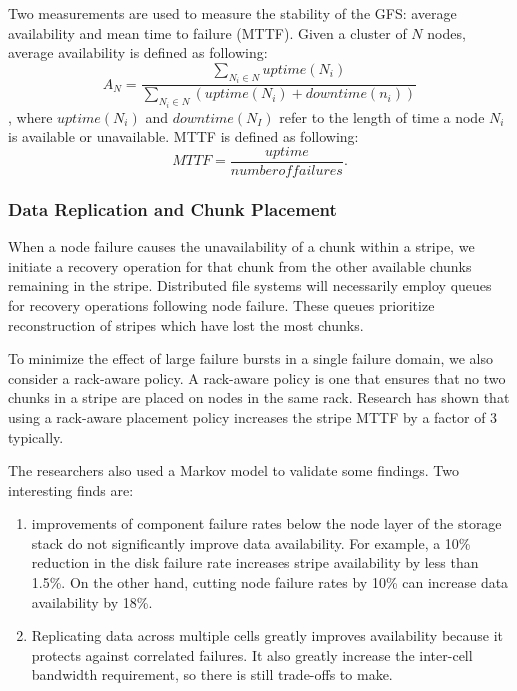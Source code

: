 Two measurements are used to measure the stability of the GFS: 
average availability and mean time to failure (MTTF). 
%
Given a cluster of $N$ nodes, average availability is defined as following:
%
\begin{equation}
A_{N}=\frac{\sum_{N_i\in N} uptime(N_i)}{\sum_{N_i\in N}(uptime(N_i) + downtime(n_i))}
\end{equation},
%
where $uptime(N_i)$ and $downtime(N_I)$ refer to the length of time a node $N_i$
is available or unavailable.
%
MTTF is defined as following:
\begin{equation}
MTTF=\frac{uptime}{number of failures}.
\end{equation}


\subsubsection{Data Replication and Chunk Placement}
When a node failure causes the unavailability of a chunk within a stripe, 
we initiate a recovery operation for that chunk from the other available 
chunks remaining in the stripe.
%
Distributed file systems will necessarily employ
queues for recovery operations following node failure. 
These queues prioritize reconstruction of stripes which
have lost the most chunks.

To minimize the effect of large failure bursts in a single failure domain,
we also consider a rack-aware policy.
%
A rack-aware policy is one that ensures that no two chunks in a stripe are 
placed on nodes in the same rack.
%
Research has shown that using a rack-aware placement policy increases 
the stripe MTTF by a factor of 3 typically.

The researchers also used a Markov model to validate some findings.
%
Two interesting finds are:
\begin{enumerate}
\item improvements of component failure rates below the node layer
	of the storage stack do not significantly improve data availability.
	For example, a 10\% reduction in the disk failure rate increases 
	stripe availability by less than 1.5\%. On the other hand, cutting node 
	failure rates by 10\% can increase data availability by 18\%. 
\item Replicating data across multiple cells  greatly improves availability 
	because it protects against correlated failures.
	It also greatly increase the inter-cell bandwidth requirement, so there 
	is still trade-offs to make.
\end{enumerate}


